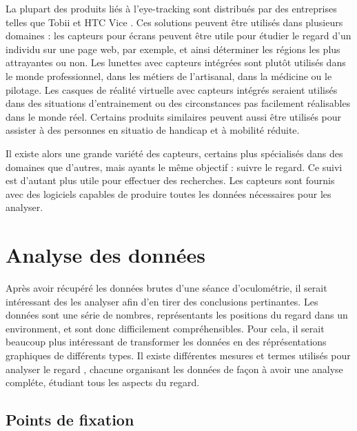 \documentclass[12pt]{article}
\begin{document}
\bigskip
La plupart des produits liés à l'eye-tracking sont distribués par des
entreprises telles que Tobii \cite{tobii} et HTC Vice \cite{htc_vive_pro_eye}.
Ces solutions peuvent être utilisés dans plusieurs domaines \cite{yt:tobii_vr}
: les capteurs pour écrans peuvent être utile pour étudier le regard d'un
individu sur une page web, par exemple, et ainsi déterminer les régions les
plus attrayantes ou non. Les lunettes avec capteurs intégrées sont plutôt
utilisés dans le monde professionnel, dans les métiers de l'artisanal, dans la
médicine ou le pilotage. Les casques de réalité virtuelle avec capteurs
intégrés seraient utilisés dans des situations d'entrainement ou des
circonstances pas facilement réalisables dans le monde réel. Certains produits
similaires peuvent aussi être utilisés pour assister à des personnes en
situatio de handicap et à mobilité réduite.

\bigskip
Il existe alors une grande variété des capteurs, certains plus spécialisés dans
des domaines que d'autres, mais ayants le même objectif : suivre le regard. Ce
suivi est d'autant plus utile pour effectuer des recherches. Les capteurs sont
fournis avec des logiciels capables de produire toutes les données nécessaires
pour les analyser.


\section{Analyse des données}

Après avoir récupéré les données brutes d'une séance d'oculométrie, il serait
intéressant des les analyser afin d'en tirer des conclusions pertinantes. Les
données sont une série de nombres, représentants les positions du regard dans un
environment, et sont donc difficilement compréhensibles. Pour cela, il serait
beaucoup plus intéressant de transformer les données en des réprésentations
graphiques de différents types. Il existe différentes mesures et termes
utilisés pour analyser le regard \cite{imotions:metrics}, chacune organisant
les données de façon à avoir une analyse compléte, étudiant tous les aspects du
regard.

\subsection{Points de fixation}
\end{document}
